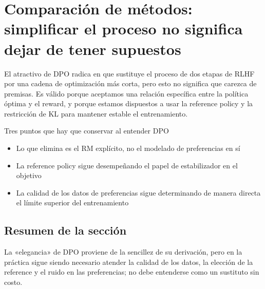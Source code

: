 \section{Comparación de métodos: simplificar el proceso no significa dejar de tener supuestos}
El atractivo de DPO radica en que sustituye el proceso de dos etapas de RLHF por una cadena de optimización más corta, pero esto no significa que carezca de premisas. Es válido porque aceptamos una relación específica entre la política óptima y el reward, y porque estamos dispuestos a usar la reference policy y la restricción de KL para mantener estable el entrenamiento.

\begin{knowledgebox}{Tres puntos que hay que conservar al entender DPO}
\begin{itemize}
  \item Lo que elimina es el RM explícito, no el modelado de preferencias en sí
  \item La reference policy sigue desempeñando el papel de estabilizador en el objetivo
  \item La calidad de los datos de preferencias sigue determinando de manera directa el límite superior del entrenamiento
\end{itemize}
\end{knowledgebox}

\subsection{Resumen de la sección}
La «elegancia» de DPO proviene de la sencillez de su derivación, pero en la práctica sigue siendo necesario atender la calidad de los datos, la elección de la reference y el ruido en las preferencias; no debe entenderse como un sustituto sin costo.

\newpage
